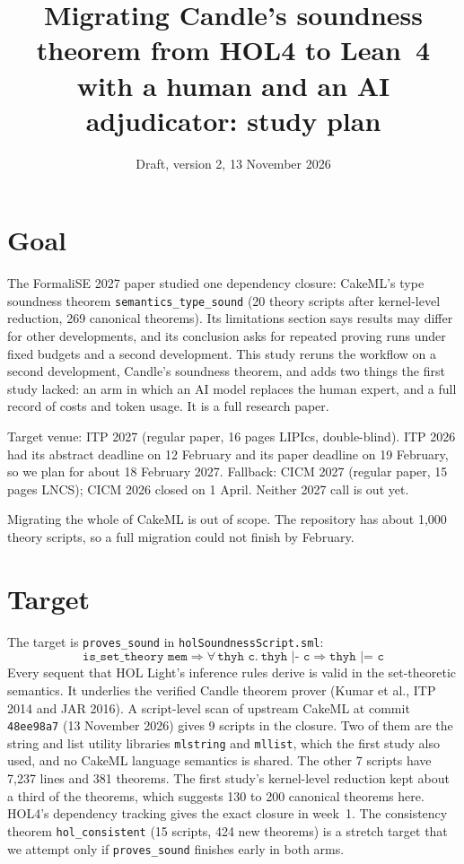 \documentclass[11pt,a4paper]{article}
\title{Migrating Candle's soundness theorem from HOL4 to Lean~4 with a human and an AI adjudicator: study plan}
\author{Draft, version 2, 13 November 2026}
\date{}
\newcommand{\code}[1]{\texttt{#1}}
\begin{document}
\sloppy
\maketitle

\section{Goal}
The FormaliSE 2027 paper studied one dependency closure: CakeML's type soundness theorem \code{semantics\_type\_sound} (20 theory scripts after kernel-level reduction, 269 canonical theorems). Its limitations section says results may differ for other developments, and its conclusion asks for repeated proving runs under fixed budgets and a second development. This study reruns the workflow on a second development, Candle's soundness theorem, and adds two things the first study lacked: an arm in which an AI model replaces the human expert, and a full record of costs and token usage. It is a full research paper.

Target venue: ITP 2027 (regular paper, 16 pages LIPIcs, double-blind). ITP 2026 had its abstract deadline on 12 February and its paper deadline on 19 February, so we plan for about 18 February 2027. Fallback: CICM 2027 (regular paper, 15 pages LNCS); CICM 2026 closed on 1 April. Neither 2027 call is out yet.

Migrating the whole of CakeML is out of scope. The repository has about 1{,}000 theory scripts, so a full migration could not finish by February.

\section{Target}
The target is \code{proves\_sound} in \code{holSoundnessScript.sml}:
\[
\code{is\_set\_theory mem} \Rightarrow \forall\,\code{thyh c}.\ \code{thyh |- c} \Rightarrow \code{thyh |= c}
\]
Every sequent that HOL Light's inference rules derive is valid in the set-theoretic semantics. It underlies the verified Candle theorem prover (Kumar et al., ITP 2014 and JAR 2016). A script-level scan of upstream CakeML at commit \code{48ee98a7} (13 November 2026) gives 9 scripts in the closure. Two of them are the string and list utility libraries \code{mlstring} and \code{mllist}, which the first study also used, and no CakeML language semantics is shared. The other 7 scripts have 7{,}237 lines and 381 theorems. The first study's kernel-level reduction kept about a third of the theorems, which suggests 130 to 200 canonical theorems here. HOL4's dependency tracking gives the exact closure in week~1. The consistency theorem \code{hol\_consistent} (15 scripts, 424 new theorems) is a stretch target that we attempt only if \code{proves\_sound} finishes early in both arms.
\end{document}
